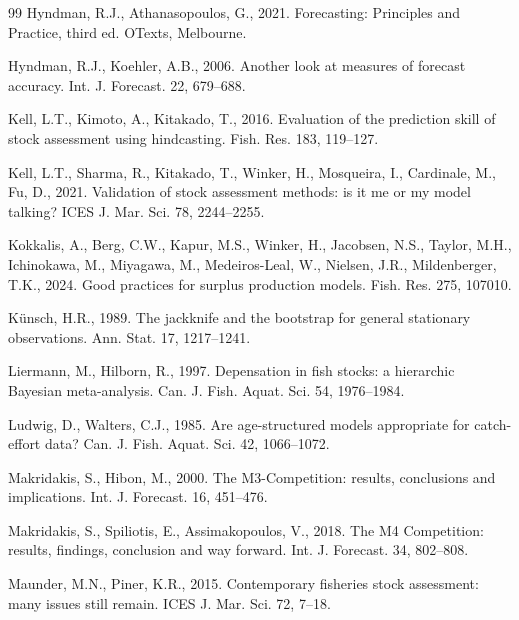 \begin{thebibliography}{99}
Hyndman, R.J., Athanasopoulos, G., 2021. Forecasting: Principles and Practice, third ed. OTexts, Melbourne.

Hyndman, R.J., Koehler, A.B., 2006. Another look at measures of forecast accuracy. Int. J. Forecast. 22, 679--688.

Kell, L.T., Kimoto, A., Kitakado, T., 2016. Evaluation of the prediction skill of stock assessment using hindcasting. Fish. Res. 183, 119--127.

Kell, L.T., Sharma, R., Kitakado, T., Winker, H., Mosqueira, I., Cardinale, M., Fu, D., 2021. Validation of stock assessment methods: is it me or my model talking? ICES J. Mar. Sci. 78, 2244--2255.

Kokkalis, A., Berg, C.W., Kapur, M.S., Winker, H., Jacobsen, N.S., Taylor, M.H., Ichinokawa, M., Miyagawa, M., Medeiros-Leal, W., Nielsen, J.R., Mildenberger, T.K., 2024. Good practices for surplus production models. Fish. Res. 275, 107010.

K{\"u}nsch, H.R., 1989. The jackknife and the bootstrap for general stationary observations. Ann. Stat. 17, 1217--1241.

Liermann, M., Hilborn, R., 1997. Depensation in fish stocks: a hierarchic Bayesian meta-analysis. Can. J. Fish. Aquat. Sci. 54, 1976--1984.

Ludwig, D., Walters, C.J., 1985. Are age-structured models appropriate for catch-effort data? Can. J. Fish. Aquat. Sci. 42, 1066--1072.

Makridakis, S., Hibon, M., 2000. The M3-Competition: results, conclusions and implications. Int. J. Forecast. 16, 451--476.

Makridakis, S., Spiliotis, E., Assimakopoulos, V., 2018. The M4 Competition: results, findings, conclusion and way forward. Int. J. Forecast. 34, 802--808.

Maunder, M.N., Piner, K.R., 2015. Contemporary fisheries stock assessment: many issues still remain. ICES J. Mar. Sci. 72, 7--18.


\end{thebibliography}
